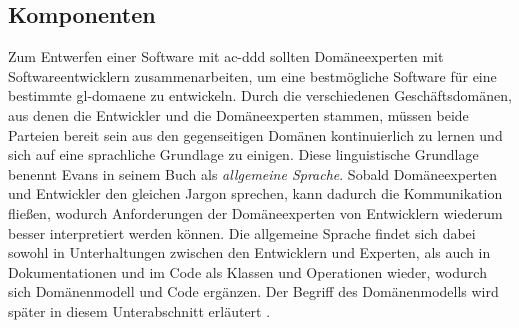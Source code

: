     \subsection{Komponenten}
    \label{subsec:komponenten}
    Zum Entwerfen einer Software mit \gls{ac-ddd} sollten Domäneexperten mit Softwareentwicklern zusammenarbeiten, um eine bestmögliche Software für eine bestimmte \gls{gl-domaene} zu entwickeln. Durch die verschiedenen Geschäftsdomänen, aus denen die Entwickler und die Domäneexperten stammen, müssen beide Parteien bereit sein aus den gegenseitigen Domänen kontinuierlich zu lernen und sich auf eine sprachliche Grundlage zu einigen. Diese linguistische Grundlage benennt Evans in seinem Buch als \emph{allgemeine Sprache}. Sobald Domäneexperten und Entwickler den gleichen Jargon sprechen, kann dadurch die Kommunikation fließen, wodurch Anforderungen der Domäneexperten von Entwicklern wiederum besser interpretiert werden können. Die allgemeine Sprache findet sich dabei sowohl in Unterhaltungen zwischen den Entwicklern und Experten, als auch in Dokumentationen und im Code als Klassen und Operationen wieder, wodurch sich Domänenmodell und Code ergänzen. Der Begriff des Domänenmodells wird später in diesem Unterabschnitt erläutert \parencite[S. 24--27]{evans2004domain}.

